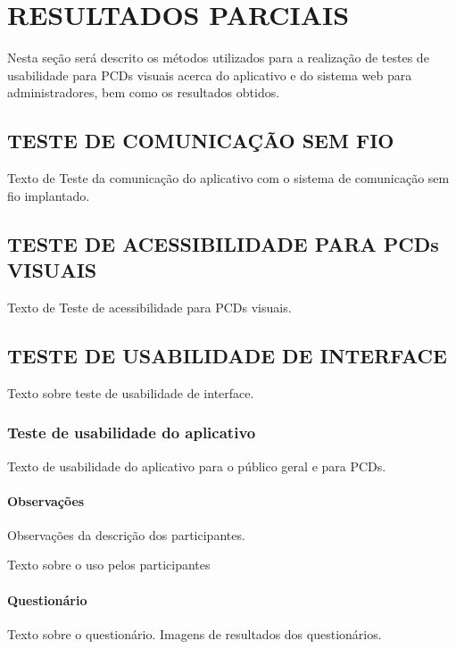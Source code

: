 \chapter{RESULTADOS PARCIAIS}
\label{cap:resultParc}

Nesta seção será descrito os métodos utilizados para a realização de testes de usabilidade para PCDs visuais acerca do aplicativo e do sistema web para administradores, bem como os resultados obtidos.

\section{TESTE DE COMUNICAÇÃO SEM FIO}

Texto de Teste da comunicação do aplicativo com o sistema de comunicação sem fio implantado.

\section{TESTE DE ACESSIBILIDADE PARA PCDs VISUAIS}

Texto de Teste de acessibilidade para PCDs visuais.

\section{TESTE DE USABILIDADE DE INTERFACE}

Texto sobre teste de usabilidade de interface.

\subsection{Teste de usabilidade do aplicativo}

Texto de usabilidade do aplicativo para o público geral e para PCDs.

\subsubsection{Observações}

Observações da descrição dos participantes.

Texto sobre o uso pelos participantes

\subsubsection{Questionário}

Texto sobre o questionário.
Imagens de resultados dos questionários.

